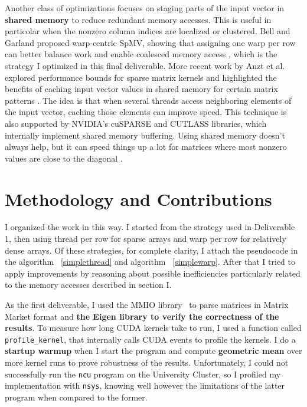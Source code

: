 \documentclass[conference]{IEEEtran}
\begin{document}
Another class of optimizations focuses on staging parts of the input vector in \textbf{shared memory} to reduce redundant memory accesses. This is useful in particolar when the nonzero column indices are localized or clustered. Bell and Garland proposed warp-centric SpMV, showing that assigning one warp per row can better balance work and enable coalesced memory access \cite{bell2008efficient}, which is the strategy I optimized in this final deliverable. More recent work by Anzt et al. explored performance bounds for sparse matrix kernels and highlighted the benefits of caching input vector values in shared memory for certain matrix patterns \cite{anzt2017designing}. The idea is that when several threads access neighboring elements of the input vector, caching those elements can improve speed. This technique is also supported by NVIDIA's cuSPARSE and CUTLASS libraries, which internally implement shared memory buffering. Using shared memory doesn't always help, but it can speed things up a lot for matrices where most nonzero values are close to the diagonal \cite{madduri2019spmv}.

\section{Methodology and Contributions}\label{sec:methodology}

I organized the work in this way. I started from the strategy used in Deliverable 1, then using thread per row for sparse arrays and warp per row for relatively dense arrays. Of these strategies, for complete clarity, I attach the pseudocode in the algorithm ~\ref{simplethread} and algorithm ~\ref{simplewarp}. After that I tried to apply improvements by reasoning about possible inefficiencies particularly related to the memory accesses described in section I.

As the first deliverable, I used the MMIO library~\cite{matrixmarketmmio} to parse matrices in Matrix Market format and \textbf{the Eigen library to verify the correctness of the results}. To measure how long CUDA kernels take to run, I used a function called \texttt{profile\_kernel}, that internally calls CUDA events to profile the kernels. I do a \textbf{startup warmup} when I start the program and compute \textbf{geometric mean} over more kernel runs to prove robustness of the results. Unfortunately, I could not successfully run the \texttt{ncu} program on the University Cluster, so I profiled my implementation with \texttt{nsys}, knowing well however the limitations of the latter program when compared to the former.
\end{document}
